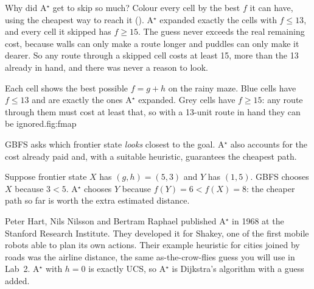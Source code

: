 Why did A$^\star$ get to skip so much? Colour every cell by the best $f$ it can have, using the cheapest way to reach it (). A$^\star$ expanded exactly the cells with $f\le13$, and every cell it skipped has $f\ge15$. The guess never exceeds the real remaining cost, because walls can only make a route longer and puddles can only make it dearer. So any route through a skipped cell costs at least 15, more than the 13 already in hand, and there was never a reason to look.

\begin{utpfig}{Each cell shows the best possible $f=g+h$ on the rainy maze. Blue cells have $f\le13$ and are exactly the ones A$^\star$ expanded. Grey cells have $f\ge15$: any route through them must cost at least that, so with a 13-unit route in hand they can be ignored.}{fig:fmap}
\end{utpfig}

\begin{keyidea}
GBFS asks which frontier state \emph{looks} closest to the goal. A$^\star$ also accounts for the cost already paid and, with a suitable heuristic, guarantees the cheapest path.
\end{keyidea}

\begin{workedexample}
Suppose frontier state $X$ has $(g,h)=(5,3)$ and $Y$ has $(1,5)$. GBFS chooses $X$ because $3<5$. A$^\star$ chooses $Y$ because $f(Y)=6<f(X)=8$: the cheaper path so far is worth the extra estimated distance.
\end{workedexample}

\begin{libnote}
Peter Hart, Nils Nilsson and Bertram Raphael published A$^\star$ in 1968 at the Stanford Research Institute. They developed it for Shakey, one of the first mobile robots able to plan its own actions. Their example heuristic for cities joined by roads was the airline distance, the same as-the-crow-flies guess you will use in Lab~2. A$^\star$ with $h=0$ is exactly UCS, so A$^\star$ is Dijkstra's algorithm with a guess added.
\end{libnote}

